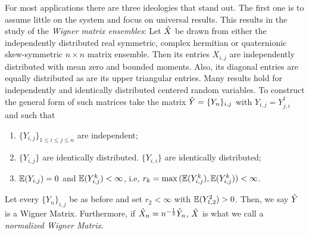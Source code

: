 For most applications there are three ideologies that stand out. The first one is to assume little on the system and focus on universal results. This results in the study of the \textit{Wigner matrix ensembles}: Let $\hat X$ be drawn from either the independently distributed real symmetric, complex hermitian or quaternionic skew-symmetric $n \times n$ matrix ensemble. Then its entries $X_{i,j}$ are independently distributed with mean zero and bounded moments. Also, its diagonal entries are equally distributed as are its upper triangular entries. Many results hold for independently and identically distributed centered random variables. To construct the general form of such matrices take the matrix $\hat Y = \{Y_n\}_{i,j}$ with $Y_{i,j} = Y_{j,i}^\dagger$ and such that
\begin{enumerate}
	\item $\{Y_{i,j}\}_{1\leq i \leq j \leq n}$ are independent;
	\item $\{Y_{i,j}\}$ are identically distributed. $\{Y_{i,i}\}$ are identically distributed;
	\item $\mathbb{E}(Y_{i,j}) = 0$  and $ \mathbb{E}(Y_{i,j}^k)< \infty$, i.e, $r_k = \max{(\mathbb{E}(Y_{i,j}^k), \mathbb{E}(Y_{i,j}^k))} < \infty$.
\end{enumerate}

\begin{definition}
	Let every $\{Y_n\}_{i,j}$ be as before and set $r_2 < \infty$ with $\mathbb{E}(Y_{1,2}^2) > 0$. Then, we say $\hat Y$ is a Wigner Matrix. Furthermore, if $\hat X_n = n^{-\frac{1}{2}} \hat Y_n$, $\hat X$ is what we call a \textit{normalized Wigner Matrix}.
	\label{Def: Wigner Matrix}
\end{definition}

